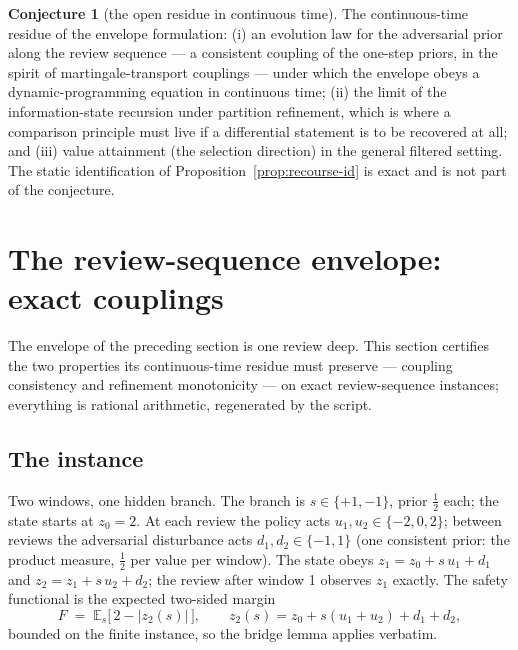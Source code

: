 \documentclass[10pt,twocolumn]{article}
\theoremstyle{definition}
\newtheorem{conjecture}{Conjecture}
\begin{document}
\begin{conjecture}[the open residue in continuous time]\label{conj:envelope}
The continuous-time residue of the envelope formulation: (i) an evolution
law for the adversarial prior along the review sequence --- a consistent
coupling of the one-step priors, in the spirit of martingale-transport
couplings --- under which the envelope obeys a dynamic-programming equation
in continuous time; (ii) the limit of the information-state recursion under
partition refinement, which is where a comparison principle must live if a
differential statement is to be recovered at all; and (iii) value
attainment (the selection direction) in the general filtered setting. The
static identification of Proposition~\ref{prop:recourse-id} is exact and is
not part of the conjecture.
\end{conjecture}

\section{The review-sequence envelope: exact couplings}

The envelope of the preceding section is one review deep. This section certifies
the two properties its continuous-time residue must preserve --- coupling
consistency and refinement monotonicity --- on exact review-sequence
instances; everything is rational arithmetic, regenerated by the script.

\subsection{The instance}

Two windows, one hidden branch. The branch is $s \in \{+1, -1\}$, prior
$\tfrac{1}{2}$ each; the state starts at $z_0 = 2$. At each review the
policy acts $u_1, u_2 \in \{-2, 0, 2\}$; between reviews the adversarial
disturbance acts $d_1, d_2 \in \{-1, 1\}$ (one consistent prior: the
product measure, $\tfrac{1}{2}$ per value per window). The state obeys
$z_1 = z_0 + s\, u_1 + d_1$ and $z_2 = z_1 + s\, u_2 + d_2$; the review
after window 1 observes $z_1$ exactly. The safety functional is the
expected two-sided margin
\[
F \;=\; \mathbb{E}_{s}\bigl[\, 2 - |z_{2}(s)| \,\bigr],
\qquad z_{2}(s) = z_0 + s(u_1 + u_2) + d_1 + d_2,
\]
bounded on the finite instance, so the bridge lemma applies verbatim.
\end{document}
